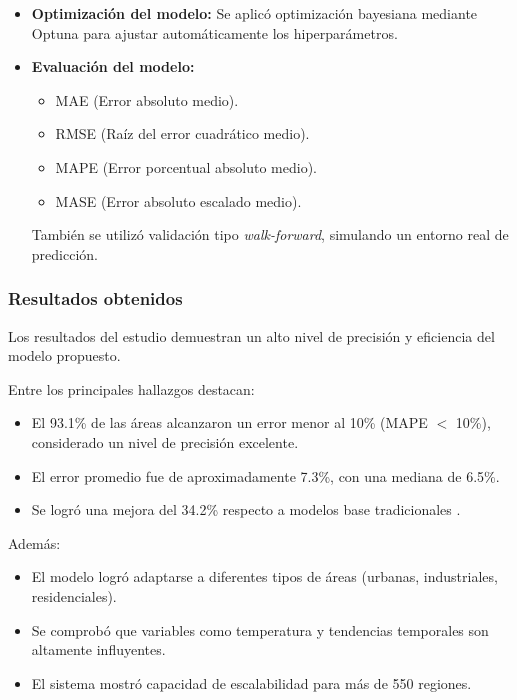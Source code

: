 \begin{itemize}
    \item \textbf{Optimización del modelo:}
    Se aplicó optimización bayesiana mediante Optuna para ajustar automáticamente los hiperparámetros.

    \item \textbf{Evaluación del modelo:}
    \begin{itemize}
        \item MAE (Error absoluto medio).
        \item RMSE (Raíz del error cuadrático medio).
        \item MAPE (Error porcentual absoluto medio).
        \item MASE (Error absoluto escalado medio).
    \end{itemize}

    También se utilizó validación tipo \textit{walk-forward}, simulando un entorno real de predicción.
\end{itemize}

\subsubsection{Resultados obtenidos}

Los resultados del estudio demuestran un alto nivel de precisión y eficiencia del modelo propuesto.

Entre los principales hallazgos destacan:

\begin{itemize}
    \item El 93.1\% de las áreas alcanzaron un error menor al 10\% (MAPE $<$ 10\%), considerado un nivel de precisión excelente.
    \item El error promedio fue de aproximadamente 7.3\%, con una mediana de 6.5\%.
    \item Se logró una mejora del 34.2\% respecto a modelos base tradicionales \cite{ref_agua}.
\end{itemize}

Además:

\begin{itemize}
    \item El modelo logró adaptarse a diferentes tipos de áreas (urbanas, industriales, residenciales).
    \item Se comprobó que variables como temperatura y tendencias temporales son altamente influyentes.
    \item El sistema mostró capacidad de escalabilidad para más de 550 regiones.
\end{itemize}


